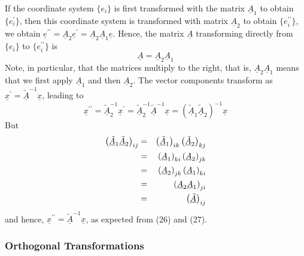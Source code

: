 If the coordinate system $\{e_i\}$ is first transformed with the 
matrix $\underline{A}_1$ to obtain $\{e^{\prime}_i\}$, then this 
coordinate system is transformed with matrix $\underline{A}_2$ to 
obtain $\{e^{\prime \prime}_i\}$, we obtain 
$\underline{e}^{\prime\prime} = \underline{A}_2 
\underline{e}^{\prime} = \underline{A}_2 \underline{A}_1 
\underline{e}$.  Hence, the matrix $\underline{A}$ transforming 
directly from $\{e_i\}$ to $\{e^{\prime\prime}_i\}$ is
\begin{equation}
\underline{A} = \underline{A}_2 \underline{A}_1
\label{chap16app-eqno27}
\end{equation}
Note, in particular, that the matrices multiply to the right, that 
is, $\underline{A}_2 \underline{A}_1$ means that we first apply 
$\underline{A}_1$ and then $\underline{A}_2$.  The vector components 
transform as $\underline{x}^{\prime} = \underline{\tilde{A}}^{-1} 
\underline{x}$, leading to
\begin{equation}
\underline{x}^{\prime\prime} = \underline{\tilde{A}}_2^{-1} 
\underline{x}^{\prime} = \underline{\tilde{A}}_2^{-1} 
\underline{\tilde{A}}^{-1} \underline{x} = 
\left( \underline{\tilde{A}}_1 \underline{\tilde{A}}_2 \right)^{-1} 
\underline{x}
\end{equation}
But
\begin{eqnarray}
\left( \underline{\tilde{A}}_1 \underline{\tilde{A}}_2 \right)_{ij} 
&=& \left( \underline{\tilde{A}}_1 \right)_{ik} \left( \underline{\tilde{A}}_2 
\right)_{kj}\cr
&=& \left( \underline{A}_1 \right)_{ki} \left( \underline{A}_2 
\right)_{jk}\cr
&=& \left( \underline{A}_2 \right)_{jk} \left( \underline{A}_1 
\right)_{ki}\cr
&=& \left( \underline{A}_2 \underline{A}_1 \right)_{ji}\cr
&=& \left( \underline{\tilde{A}} \right)_{ij}
\end{eqnarray}
and hence, $\underline{x}^{\prime\prime} = \underline{\tilde{A}}^{-1} 
\underline{x}$, as expected from (26) and (27).

\subsubsection{Orthogonal Transformations}

